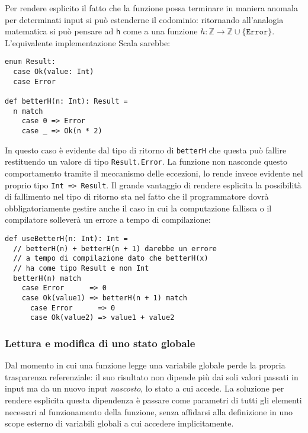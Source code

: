 Per rendere esplicito il fatto che la funzione possa terminare in maniera anomala per determinati input si può estenderne il codominio: ritornando all'analogia matematica si può pensare ad \lstinline{h} come a una funzione $h : \mathbb{Z} \rightarrow \mathbb{Z} \cup \{ \texttt{Error} \}$.
  L'equivalente implementazione Scala sarebbe:
  \begin{lstlisting}[language=scala3]
enum Result:
  case Ok(value: Int)
  case Error

def betterH(n: Int): Result =
  n match
    case 0 => Error
    case _ => Ok(n * 2)
\end{lstlisting}
  In questo caso è evidente dal tipo di ritorno di \lstinline|betterH| che questa può fallire restituendo un valore di tipo \lstinline{Result.Error}.
  La funzione non nasconde questo comportamento tramite il meccanismo delle eccezioni, lo rende invece evidente nel proprio tipo \lstinline{Int => Result}.
  Il grande vantaggio di rendere esplicita la possibilità di fallimento nel tipo di ritorno sta nel fatto che il programmatore dovrà obbligatoriamente gestire anche il caso in cui la computazione fallisca o il compilatore solleverà un errore a tempo di compilazione:
  \begin{lstlisting}[language=scala3]
def useBetterH(n: Int): Int =
  // betterH(n) + betterH(n + 1) darebbe un errore
  // a tempo di compilazione dato che betterH(x)
  // ha come tipo Result e non Int
  betterH(n) match
    case Error      => 0
    case Ok(value1) => betterH(n + 1) match
      case Error      => 0
      case Ok(value2) => value1 + value2
\end{lstlisting}

  \subsubsection{Lettura e modifica di uno stato globale}
  \label{lettura-e-modifica-di-uno-stato-globale}

  Dal momento in cui una funzione legge una variabile globale perde la propria trasparenza referenziale: il suo risultato non dipende più dai soli valori passati in input ma da un nuovo input \emph{nascosto}, lo stato a cui accede.
  La soluzione per rendere esplicita questa dipendenza è passare come parametri di tutti gli elementi necessari al funzionamento della funzione, senza affidarsi alla definizione in uno scope esterno di variabili globali a cui accedere implicitamente.

